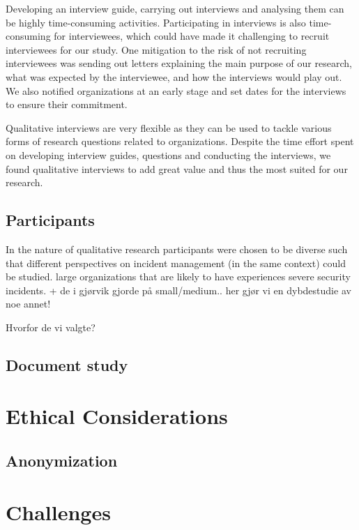 Developing an interview guide, carrying out interviews and analysing them can be highly time-consuming activities. Participating in interviews is also time-consuming for interviewees, which could have made it challenging to recruit interviewees for our study. One mitigation to the risk of not recruiting interviewees was sending out letters explaining the main purpose of our research, what was expected by the interviewee, and how the interviews would play out. We also notified organizations at an early stage and set dates for the interviews to ensure their commitment.

Qualitative interviews are very flexible as they can be used to tackle various forms of research questions related to organizations. Despite the time effort spent on developing interview guides, questions and conducting the interviews, we found qualitative interviews to add great value and thus the most suited for our research.


\subsection{Participants}
In the nature of qualitative research participants were chosen to be diverse such that different perspectives on incident management (in the same context) could be studied.
large organizations that are likely to have experiences severe security incidents. + de i gjørvik gjorde på small/medium.. her gjør vi en dybdestudie av noe annet!

Hvorfor de vi valgte?

\subsection{Document study}
\section{Ethical Considerations}
\subsection{Anonymization}
\section{Challenges}

